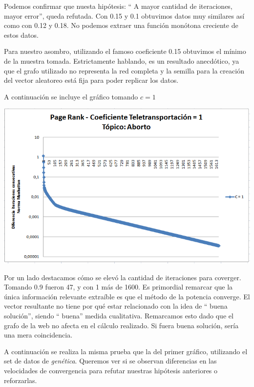 	Podemos confirmar que nuesta hipótesis: `` A mayor cantidad de iteraciones, mayor error'', queda refutada. Con 0.15 y 0.1 obtuvimos datos muy similares así como con 0.12 y 0.18. No podemos extraer una función monótona creciente de estos datos. 

	Para nuestro asombro, utilizando el famoso coeficiente 0.15 obtuvimos el mínimo de la muestra tomada. Estrictamente hablando, es un resultado anecdótico, ya que el grafo utilizado no representa la red completa y la semilla para la creación del vector aleatoreo está fija para poder replicar los datos.

	A continuación se incluye el gráfico tomando $c = 1$

	\par 
	\begin{center}
		\includegraphics[scale=0.6]{./img/page_rank_variacion_coef_teletransportacion_1.png}
	\end{center}
	\par 

	Por un lado destacamos cómo se elevó la cantidad de iteraciones para coverger. Tomando 0.9 fueron 47, y con 1 más de 1600. Es primordial remarcar que la única información relevante extraíble es que el método de la potencia converge. El vector resultante no tiene por qué estar relacionado con la idea de `` buena solución'', siendo `` buena'' medida cualitativa. Remarcamos esto dado que el grafo de la web no afecta en el cálculo realizado. Si fuera buena solución, sería una mera coincidencia.

	A continuación se realiza la misma prueba que la del primer gráfico, utilizando el set de datos de \textit{genética}. Queremos ver si se observan diferencias en las velocidades de convergencia para refutar nuestras hipótesis anteriores o reforzarlas.

